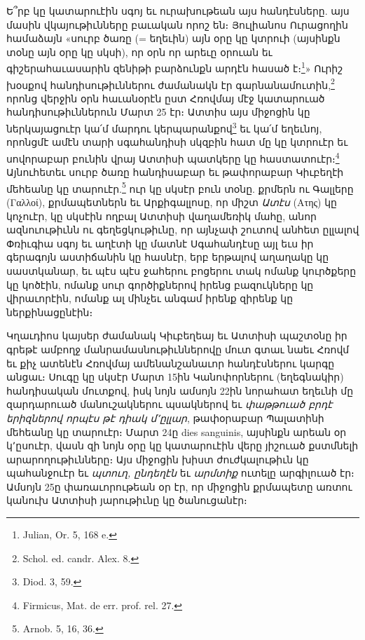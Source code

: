 \documentclass{article}
\begin{document}
{Ե՞րբ կը կատարուէին սգոյ եւ ուրախութեան այս հանդէսները. այս մասին վկայութիւնները բաւական որոշ են։ Յուլիանոս Ուրացողին համաձայն «սուրբ ծառը (= եղեւին) այն օրը կը կտրուի (այսինքն տօնը այն օրը կը սկսի), որ օրն որ արեւը օրուան եւ գիշերահաւասարին զենիթի բարձունքն արդէն հասած է։\footnote{Julian, Or. 5, 168 e.}» Ուրիշ խօսքով հանդիսութիւններու ժամանակն էր գարնանամուտին,\footnote{Schol. ed. candr. Alex. 8.} որոնց վերջին օրն հաւանօրէն ըստ Հռովմայ մէջ կատարուած հանդիսութիւններուն Մարտ 25 էր։ Ատտիս այս միջոցին կը ներկայացուէր կա՛մ մարդու կերպարանքով\footnote{Diod. 3, 59.} եւ կա՛մ եղեւնոյ, որոնցմէ ամէն տարի սգահանդիսի սկզբին հատ մը կը կտրուէր եւ սովորաբար բունին վրայ Ատտիսի պատկերը կը հաստատուէր։\footnote{Firmicus, Mat. de err. prof. rel. 27.} Այնուհետեւ սուրբ ծառը հանդիսաբար եւ թափորաբար Կիւբեղէի մեհեանը կը տարուէր.\footnote{Arnob. 5, 16, 36.} ուր կը սկսէր բուն տօնը. քրմերն ու Գալլերը (Γαλλοί), քրմապետներն եւ Արքիգալլոսը, որ միշտ \emph{Ատէս} (Ατης) կը կոչուէր, կը սկսէին ողբալ Ատտիսի վաղամեռիկ մահը, անոր ազնուութիւնն ու գեղեցկութիւնը, որ այնչափ շուտով անհետ ըլլալով Փռիւգիա սգոյ եւ աղէտի կը մատնէ Սգահանդէսը այլ եւս իր գերագոյն աստիճանին կը հասնէր, երբ երթալով աղաղակը կը սաստկանար, եւ պէս պէս ջահերու բոցերու տակ ոմանք կուրծքերը կը կոծէին, ոմանք սուր գործիքներով իրենց բազուկները կը վիրաւորէին, ոմանք ալ մինչեւ անգամ իրենք զիրենք կը ներքինացընէին։

Կղաւդիոս կայսեր ժամանակ Կիւբեղեայ եւ Ատտիսի պաշտօնը իր գրեթէ ամբողջ մանրամասնութիւններովը մուտ գտաւ նաեւ Հռովմ եւ քիչ ատենէն Հռովմայ ամենանշանաւոր հանդէսներու կարգը անցաւ։ Սուգը կը սկսէր Մարտ 15ին Կանոփորներու (եղեգնակիր) հանդիսական մուտքով, իսկ նոյն ամսոյն 22ին նորահատ եղեւնի մը զարդարուած մանուշակներու պսակներով եւ \emph{փաթթուած բրդէ երիզներով որպէս թէ դիակ մ՚ըլլար}, թափօրաբար Պալատինի մեհեանը կը տարուէր։ Մարտ 24ը dies sanguinis, այսինքն արեան օր կ՚ըսուէր, վասն զի նոյն օրը կը կատարուէին վերը յիշուած քստմնելի արարողութիւնները։ Այս միջոցին խիստ ժուժկալութիւն կը պահանջուէր եւ \emph{պտուղ, ընդեղէն} եւ \emph{արմտիք} ուտելը արգիլուած էր։ Ամսոյն 25ը փառաւորութեան օր էր, որ միջոցին քրմապետը առտու կանուխ Ատտիսի յարութիւնը կը ծանուցանէր։

}
\end{document}
